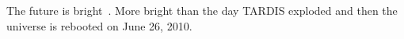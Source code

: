 The future is bright~\cite{big}. More bright than the day TARDIS exploded and then the universe is rebooted on June 26, 2010.